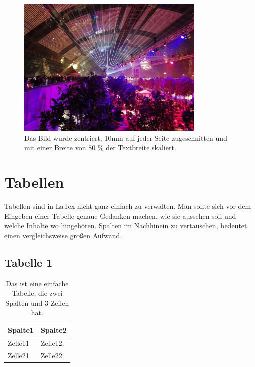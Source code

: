 \begin{figure}[htb]
  \centering  
  \includegraphics[width=0.8\textwidth, trim = 10mm 10mm 10mm 10mm, clip]{img/34c3.pdf}
  \caption{Das Bild wurde zentriert, 10mm auf jeder Seite zugeschnitten und mit einer Breite von 80 \% der Textbreite skaliert.} 
  \label{fig:34c3}
\end{figure}
\FloatBarrier



\section{Tabellen}
\label{sec:Tabellen}
Tabellen sind in LaTex nicht ganz einfach zu verwalten. Man sollte sich vor dem Eingeben einer Tabelle genaue Gedanken machen, wie sie aussehen soll und welche Inhalte wo hingehören. Spalten im Nachhinein zu vertauschen, bedeutet einen vergleichsweise großen Aufwand.

\subsection{Tabelle 1}
\label{subsection:Tabelle1}

\newcolumntype{b}{X}
\begin{table}[H]
\begin{tabularx}{\textwidth}{sb}
\textbf{Spalte1} & \textbf{Spalte2}\\
\hline

Zelle11 & Zelle12.  \\ \hline

Zelle21 & Zelle22. \\ \hline

\end{tabularx}
\caption[Eine Einfache Tabelle zum darstellen von Werten]{Das ist eine einfache Tabelle, die  zwei Spalten und 3 Zeilen hat.
\label{tab:Tabelle1}}
\end{table}
\FloatBarrier

